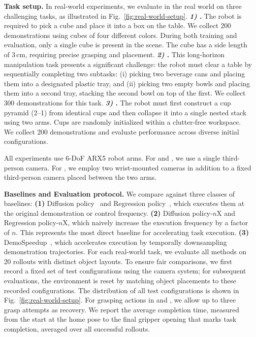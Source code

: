 \noindent\textbf{Task setup.} In real-world experiments, we evaluate \our in the real world on three challenging tasks, as illustrated in Fig.~\ref{fig:real-world-setup}.
%
\noindent\textbf{\textit{1) \pickcube}.}
The robot is required to pick a cube and place it into a box on the table. We collect 200 demonstrations using cubes of four different colors. During both training and evaluation, only a single cube is present in the scene.
The cube has a side length of $3\,\mathrm{cm}$, requiring precise grasping and placement. \noindent\textbf{\textit{2) \cleantable}.}
This long-horizon manipulation task presents a significant challenge: the robot must clear a table by sequentially completing two subtasks: (i) picking two beverage cans and placing them into a designated plastic tray, and (ii) picking two empty bowls and placing them into a second tray, stacking the second bowl on top of the first. We collect 300 demonstrations for this task. 
%
\noindent\textbf{\textit{3) \stackunstack}.}
The robot must first construct a cup pyramid (2--1) from identical cups and then collapse it into a single nested stack using two arms.
Cups are randomly initialized within a clutter-free workspace. We collect 200 demonstrations and evaluate performance across diverse initial configurations.

All experiments use 6-DoF ARX5 robot arms. For \pickcube and \cleantable, we use a single third-person camera. For \stackunstack, we employ two wrist-mounted cameras in addition to a fixed third-person camera placed between the two arms.



\noindent\textbf{Baselines and Evaluation protocol.}
We compare \our against three classes of baselines:
\textbf{(1)} Diffusion policy~\cite{dp} and Regression policy~\cite{act}, which executes them at the original demonstration or control frequency. \textbf{(2)} Diffusion policy-$n$X and Regression policy-$n$X, which naively increase the execution frequency by a factor of $n$. This represents the most direct baseline for accelerating task execution. \textbf{(3)} DemoSpeedup~\cite{demospeedup}, which accelerates execution by temporally downsampling demonstration trajectories. 
%
For each real-world task, we evaluate all methods on 20 rollouts with distinct object layouts. To ensure fair comparisons, we first record a fixed set of test configurations using the camera system; for subsequent evaluations, the environment is reset by matching object placements to these recorded configurations. The distribution of all test configurations is shown in Fig.~\ref{fig:real-world-setup}. For grasping actions in \pickcube and \cleantable, we allow up to three grasp attempts as recovery. We report the average completion time, measured from the start at the home pose to the final gripper opening that marks task completion, averaged over all successful rollouts.

